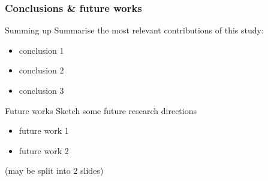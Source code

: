 \documentclass[presentation]{beamer}\mode<presentation>{\usetheme{AMSBolognaFC}}
\begin{document}
\begin{frame}%
\frametitle{Conclusions \& future works}

\begin{block}{Summing up}
    Summarise the most relevant contributions of this study:
    \begin{itemize}
        \item conclusion 1
        \item conclusion 2
        \item conclusion 3
    \end{itemize}
\end{block}

\begin{exampleblock}{Future works}
    Sketch some future research directions
    \begin{itemize}
        \item future work 1
        \item future work 2
    \end{itemize}
\end{exampleblock}

(may be split into 2 slides)

\end{frame}

\section*{}
\frame{\titlepage}

\end{document}

